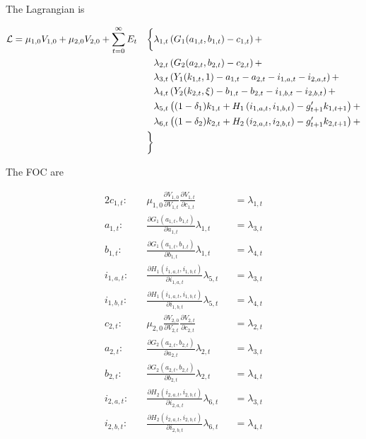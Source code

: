 \documentclass[10pt]{article}
\newcommand{\fracpd}[2]{
  \ensuremath{\frac{\partial #1}{\partial #2}}
}
\begin{document}
The Lagrangian is

\begin{alignat}{2} \label{eq:lagrangian}
  \mathcal{L} &= \mu_{1,0} V_{1,0} + \mu_{2,0} V_{2,0} + \sum_{t=0}^{\infty} E_t & \biggm \{
  &\lambda_{1,t} \left( G_1(a_{1,t}, b_{1,t}) - c_{1,t} \right) + \notag \\
  & & &\lambda_{2,t} \left( G_2(a_{2,t}, b_{2,t}) - c_{2,t} \right) + \notag \\
  & & &\lambda_{3,t} \left( Y_1(k_{1,t},1) - a_{1,t} - a_{2,t} - i_{1,a,t} - i_{2,a,t} \right) + \notag \\
  & & &\lambda_{4,t} \left( Y_2(k_{2,t}, \xi) - b_{1,t} - b_{2,t} - i_{1,b,t} - i_{2,b,t} \right) + \notag \\
  & & &\lambda_{5,t} \left( (1-\delta_1)k_{1,t} + H_1 \left(i_{1,a,t}, i_{1,b,t} \right) - g_{t+1}'k_{1,t+1} \right) + \notag \\
  & & &\lambda_{6,t} \left( (1-\delta_2)k_{2,t} + H_2 \left(i_{2,a,t}, i_{2,b,t} \right) - g_{t+1}'k_{2,t+1} \right) + \notag \\
   && \biggm\}
\end{alignat}

The FOC are

\begin{alignat}{2}
  c_{1,t} : \quad   & \mu_{1,0} \fracpd{V_{1,0}}{V_{1,t}} \fracpd{V_{1,t}}{c_{1,t}} & &= \lambda_{1,t} \label{eq:c1} \\
  a_{1,t} : \quad   & \fracpd{G_1(a_{1,t}, b_{1,t})}{a_{1,t}} \lambda_{1,t} & &= \lambda_{3,t} \label{eq:a1} \\
  b_{1,t} : \quad   & \fracpd{G_1(a_{1,t}, b_{1,t})}{b_{1,t}} \lambda_{1,t} & &= \lambda_{4,t} \label{eq:b1} \\
  i_{1,a,t} : \quad & \fracpd{H_1(i_{1,a,t}, i_{1,b,t})}{i_{1,a,t}} \lambda_{5,t} & &= \lambda_{3,t} \label{eq:i1a} \\
  i_{1,b,t} : \quad & \fracpd{H_1(i_{1,a,t}, i_{1,b,t})}{i_{1,b,t}} \lambda_{5,t} & &= \lambda_{4,t} \label{eq:i1b} \\
  c_{2,t} : \quad   & \mu_{2,0} \fracpd{V_{2,0}}{V_{2,t}} \fracpd{V_{2,t}}{c_{2,t}}  & &= \lambda_{2,t} \label{eq:c2} \\
  a_{2,t} : \quad   & \fracpd{G_2(a_{2,t}, b_{2,t})}{a_{2,t}} \lambda_{2,t} & &= \lambda_{3,t} \label{eq:a2} \\
  b_{2,t} : \quad   & \fracpd{G_2(a_{2,t}, b_{2,t})}{b_{2,t}} \lambda_{2,t} & &= \lambda_{4,t} \label{eq:b2} \\
  i_{2,a,t} : \quad & \fracpd{H_2(i_{2,a,t}, i_{2,b,t})}{i_{2,a,t}} \lambda_{6,t} & &= \lambda_{3,t} \label{eq:i2a} \\
  i_{2,b,t} : \quad & \fracpd{H_2(i_{2,a,t}, i_{2,b,t})}{i_{2,b,t}} \lambda_{6,t} & &= \lambda_{4,t} \label{eq:i2b}
\end{alignat}
\end{document}
